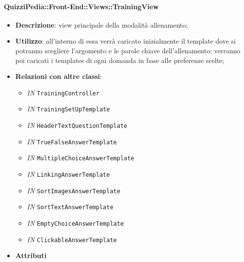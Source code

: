 \paragraph{QuizziPedia::Front-End::Views::TrainingView}
\begin{itemize}
	\item \textbf{Descrizione}: view principale della modalità allenamento;
	\item \textbf{Utilizzo}: all'interno di essa verrà caricato inizialmente il template dove si potranno scegliere l'argomento e le parole chiave dell'allenamento; verranno poi caricati i templates di ogni domanda in base alle preferenze scelte; 
	\item \textbf{Relazioni con altre classi}:
	\begin{itemize}
		\item \textit{IN} \texttt{TrainingController} \\
		\item \textit{IN} \texttt{TrainingSetUpTemplate} \\
		\item \textit{IN} \texttt{HeaderTextQuestionTemplate} \\
		\item \textit{IN} \texttt{TrueFalseAnswerTemplate} \\
		\item \textit{IN} \texttt{MultipleChoiceAnswerTemplate} \\
		\item \textit{IN} \texttt{LinkingAnswerTemplate} \\
		\item \textit{IN} \texttt{SortImagesAnswerTemplate} \\
		\item \textit{IN} \texttt{SortTextAnswerTemplate} \\
		\item \textit{IN} \texttt{EmptyChoiceAnswerTemplate} \\
		\item \textit{IN} \texttt{ClickableAnswerTemplate} \\
	\end{itemize}
	\item \textbf{Attributi}
\end{itemize}

